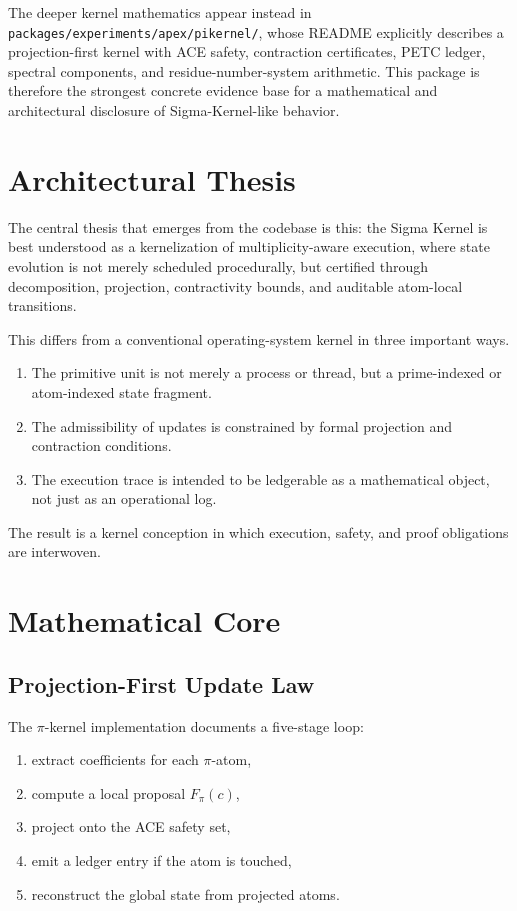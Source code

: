 \documentclass[11pt]{article}
\begin{document}
The deeper kernel mathematics appear instead in \texttt{packages/experiments/apex/pikernel/}, whose README explicitly describes a projection-first kernel with ACE safety, contraction certificates, PETC ledger, spectral components, and residue-number-system arithmetic. This package is therefore the strongest concrete evidence base for a mathematical and architectural disclosure of Sigma-Kernel-like behavior.

\section{Architectural Thesis}
The central thesis that emerges from the codebase is this: the Sigma Kernel is best understood as a kernelization of multiplicity-aware execution, where state evolution is not merely scheduled procedurally, but certified through decomposition, projection, contractivity bounds, and auditable atom-local transitions.

This differs from a conventional operating-system kernel in three important ways.
\begin{enumerate}[leftmargin=2em]
    \item The primitive unit is not merely a process or thread, but a prime-indexed or atom-indexed state fragment.
    \item The admissibility of updates is constrained by formal projection and contraction conditions.
    \item The execution trace is intended to be ledgerable as a mathematical object, not just as an operational log.
\end{enumerate}

The result is a kernel conception in which execution, safety, and proof obligations are interwoven.

\section{Mathematical Core}
\subsection{Projection-First Update Law}
The $\pi$-kernel implementation documents a five-stage loop:
\begin{enumerate}[leftmargin=2em]
    \item extract coefficients for each $\pi$-atom,
    \item compute a local proposal $F_\pi(c)$,
    \item project onto the ACE safety set,
    \item emit a ledger entry if the atom is touched,
    \item reconstruct the global state from projected atoms.
\end{enumerate}
\end{document}
